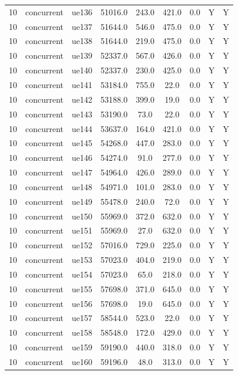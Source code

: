 \begin{table}[ht]
\begin{tabular}{|c|c|c|c|c|c|c|c|c|}
10 & concurrent & ue136 & 51016.0 & 243.0 & 421.0 & 0.0 & Y & Y \\
10 & concurrent & ue137 & 51644.0 & 546.0 & 475.0 & 0.0 & Y & Y \\
10 & concurrent & ue138 & 51644.0 & 219.0 & 475.0 & 0.0 & Y & Y \\
10 & concurrent & ue139 & 52337.0 & 567.0 & 426.0 & 0.0 & Y & Y \\
10 & concurrent & ue140 & 52337.0 & 230.0 & 425.0 & 0.0 & Y & Y \\
10 & concurrent & ue141 & 53184.0 & 755.0 & 22.0 & 0.0 & Y & Y \\
10 & concurrent & ue142 & 53188.0 & 399.0 & 19.0 & 0.0 & Y & Y \\
10 & concurrent & ue143 & 53190.0 & 73.0 & 22.0 & 0.0 & Y & Y \\
10 & concurrent & ue144 & 53637.0 & 164.0 & 421.0 & 0.0 & Y & Y \\
10 & concurrent & ue145 & 54268.0 & 447.0 & 283.0 & 0.0 & Y & Y \\
10 & concurrent & ue146 & 54274.0 & 91.0 & 277.0 & 0.0 & Y & Y \\
10 & concurrent & ue147 & 54964.0 & 426.0 & 289.0 & 0.0 & Y & Y \\
10 & concurrent & ue148 & 54971.0 & 101.0 & 283.0 & 0.0 & Y & Y \\
10 & concurrent & ue149 & 55478.0 & 240.0 & 72.0 & 0.0 & Y & Y \\
10 & concurrent & ue150 & 55969.0 & 372.0 & 632.0 & 0.0 & Y & Y \\
10 & concurrent & ue151 & 55969.0 & 27.0 & 632.0 & 0.0 & Y & Y \\
10 & concurrent & ue152 & 57016.0 & 729.0 & 225.0 & 0.0 & Y & Y \\
10 & concurrent & ue153 & 57023.0 & 404.0 & 219.0 & 0.0 & Y & Y \\
10 & concurrent & ue154 & 57023.0 & 65.0 & 218.0 & 0.0 & Y & Y \\
10 & concurrent & ue155 & 57698.0 & 371.0 & 645.0 & 0.0 & Y & Y \\
10 & concurrent & ue156 & 57698.0 & 19.0 & 645.0 & 0.0 & Y & Y \\
10 & concurrent & ue157 & 58544.0 & 523.0 & 22.0 & 0.0 & Y & Y \\
10 & concurrent & ue158 & 58548.0 & 172.0 & 429.0 & 0.0 & Y & Y \\
10 & concurrent & ue159 & 59190.0 & 440.0 & 318.0 & 0.0 & Y & Y \\
10 & concurrent & ue160 & 59196.0 & 48.0 & 313.0 & 0.0 & Y & Y \\

\end{tabular}
\end{table}

